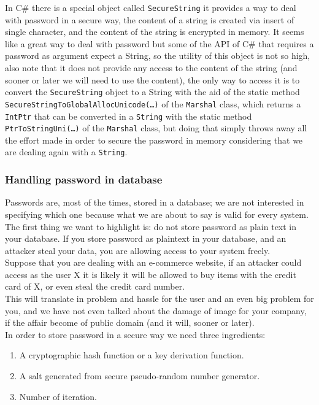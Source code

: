 In C\# there is a special object called \texttt{SecureString} it provides a way to deal with password in a secure way, the content of a string is created via insert of single character, and the content of the string is encrypted in memory.\newline
It seems like a great way to deal with password but some of the API of C\# that requires a password as argument expect a String, so the utility of this object is not so high, also note that it does not provide any access to the content of the string (and sooner or later we will need to use the content), the only way to access it is to convert the \texttt{SecureString} object to a String with the aid of the static method \texttt{SecureStringToGlobalAllocUnicode(…)} of the \texttt{Marshal} class, which returns a \texttt{IntPtr} that can be converted in a \texttt{String} with the static method \texttt{PtrToStringUni(…)} of the \texttt{Marshal} class, but doing that simply throws away all the effort made in order to secure the password in memory considering that we are dealing again with a \texttt{String}.\newline

\subsubsection{Handling password in database}
Passwords are, most of the times, stored in a database; we are not interested in specifying which one because what we are about to say is valid for every system.\newline
The first thing we want to highlight is: do not store password as plain text in your database.\newline
If you store password as plaintext in your database, and an attacker steal your data, you are allowing access to your system freely.\\

Suppose that you are dealing with an e-commerce website, if an attacker could access as the user X it is likely it will be allowed to buy items with the credit card of X, or even steal the credit card number.\\
This will translate in problem and hassle for the user and an even big problem for you, and we have not even talked about the damage of image for your company, if the affair become of public domain (and it will, sooner or later).\\
In order to store password in a secure way we need three ingredients:
\begin{enumerate}
	\item A cryptographic hash function or a key derivation function.
	\item A salt generated from secure pseudo-random number generator.
	\item Number of iteration.
\end{enumerate}

